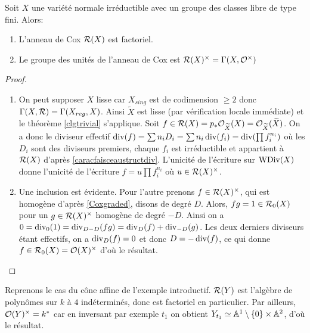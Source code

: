 \begin{thm}\label{coxFreeFactoriel}
Soit $X$ une variété normale irréductible avec un groupe des classes libre de type fini. Alors:
\begin{enumerate}
\item L'anneau de Cox $\mathcal{R}(X)$ est factoriel.
\item Le groupe des unités de l'anneau de Cox est $\mathcal{R}(X)^\times=\Gamma(X,\mathcal{O}^\times)$
\end{enumerate}
\end{thm}
\begin{proof}
\begin{enumerate}
\item On peut supposer $X$ lisse car $X_{sing}$ est de codimension $\geq 2$ donc $\Gamma(X, \mathcal{R})=\Gamma(X_{reg}, X)$. Ainsi $\widetilde{X}$ est lisse (par vérification locale immédiate) et le théorème \ref{clgtrivial} s'applique. Soit $f\in \mathcal{R}(X)=p_*\mathcal{O}_{\widetilde{X}}(X)=\mathcal{O}_{\widetilde{X}}(\widetilde{X})$. On a donc le diviseur effectif $\operatorname{div}(f)= \sum n_iD_i=\sum n_i\operatorname{div}(f_i)=\operatorname{div}(\prod f_i^{n_i})$ où les $D_i$ sont des diviseurs premiers, chaque $f_i$ est irréductible et appartient à $\mathcal{R}(X)$ d'après \ref{caracfaisceaustructdiv}. L'unicité de l'écriture sur $\operatorname{WDiv}(X)$ donne l'unicité de l'écriture $f=u\prod f_i^{n_i}$ où $u\in \mathcal{R}(X)^\times$.
\item Une inclusion est évidente. Pour l'autre prenons $f\in\mathcal{R}(X)^\times$, qui est homogène d'après \ref{Coxgraded}, disons de degré $D$. Alors, $fg=1\in \mathcal{R}_0(X)$ pour un $g\in\mathcal{R}(X)^\times$ homogène de degré $-D$. Ainsi on a $0=\operatorname{div}_0(1)=\operatorname{div}_{D-D}(fg)=\operatorname{div}_D(f)+\operatorname{div}_{-D}(g)$. Les deux derniers diviseurs étant effectifs, on a $\operatorname{div}_D(f)=0$ et donc $D=-\operatorname{div}(f)$, ce qui donne $f\in\mathcal{R}_0(X)=\mathcal{O}(X)^\times$ d'où le résultat.
\end{enumerate}
\end{proof}

\begin{ex}
Reprenons le cas du cône affine de l'exemple introductif.  $\mathcal{R}(Y)$ est l'algèbre de polynômes sur $k$ à $4$ indéterminés, donc est factoriel en particulier.  Par ailleurs, $\mathcal{O}(Y)^{\times}=k^*$ car en inversant par exemple $t_1$  on obtient $Y_{t_1}\simeq \mathbb{A}^{1}\setminus \lbrace0\rbrace\times\mathbb{A}^{2}$, d'où le résultat.
\end{ex}

